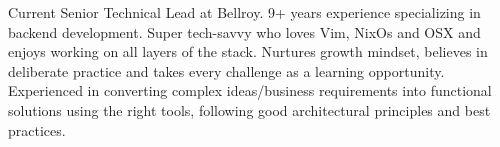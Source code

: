 

\begin{cvparagraph}

  Current Senior Technical Lead at Bellroy. 9+ years experience specializing in backend development. Super tech-savvy who loves Vim, NixOs and OSX and enjoys working on all layers of the stack. Nurtures growth mindset, believes in deliberate practice and takes every challenge as a learning opportunity. Experienced in converting complex ideas/business requirements into functional solutions using the right tools, following good architectural principles and best practices.
\end{cvparagraph}
